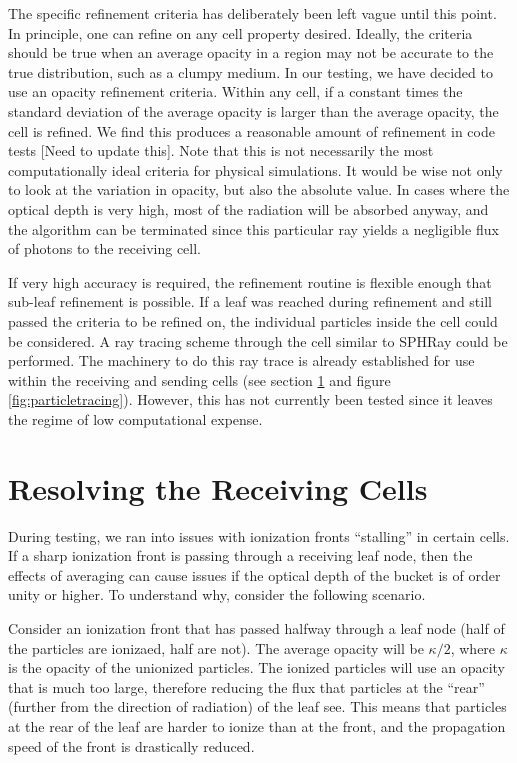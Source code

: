 The specific refinement criteria has deliberately been left vague until this point. In principle, one can refine on any cell property desired. Ideally, the criteria should be true when an average opacity in a region may not be accurate to the true distribution, such as a clumpy medium. In our testing, we have decided to use an opacity refinement criteria. Within any cell, if a constant times the standard deviation of the average opacity is larger than the average opacity, the cell is refined. We find this produces a reasonable amount of refinement in code tests [Need to update this]. Note that this is not necessarily the most computationally ideal criteria for physical simulations. It would be wise not only to look at the variation in opacity, but also the absolute value. In cases where the optical depth is very high, most of the radiation will be absorbed anyway, and the algorithm can be terminated since this particular ray yields a negligible flux of photons to the receiving cell.

If very high accuracy is required, the refinement routine is flexible enough that sub-leaf refinement is possible. If a leaf was reached during refinement and still passed the criteria to be refined on, the individual particles inside the cell could be considered. A ray tracing scheme through the cell similar to SPHRay \citep{altayEt08} could be performed. The machinery to do this ray trace is already established for use within the receiving and sending cells (see section \ref{sec:resolvingleaves} and figure \ref{fig:particletracing}). However, this has not currently been tested since it leaves the regime of low computational expense.

\section{Resolving the Receiving Cells}
\label{sec:resolvingleaves}

During testing, we ran into issues with ionization fronts ``stalling'' in certain cells. If a sharp ionization front is passing through a receiving leaf node, then the effects of averaging can cause issues if the optical depth of the bucket is of order unity or higher. To understand why, consider the following scenario.

Consider an ionization front that has passed halfway through a leaf node (half of the particles are ionizaed, half are not). The average opacity will be $\kappa/2$, where $\kappa$ is the opacity of the unionized particles. The ionized particles will use an opacity that is much too large, therefore reducing the flux that particles at the ``rear'' (further from the direction of radiation) of the leaf see. This means that particles at the rear of the leaf are harder to ionize than at the front, and the propagation speed of the front is drastically reduced.

